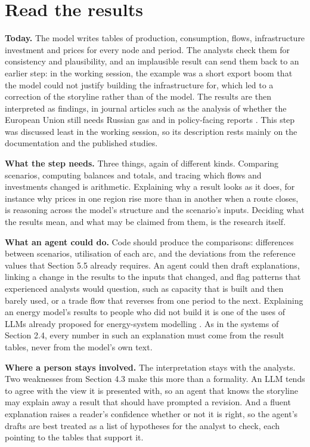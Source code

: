 \section{Read the results}

\textbf{Today.} The model writes tables of production, consumption, flows, infrastructure investment and prices for every node and period.
The analysts check them for consistency and plausibility, and an implausible result can send them back to an earlier step: in the working session, the example was a short export boom that the model could not justify building the infrastructure for, which led to a correction of the storyline rather than of the model.
The results are then interpreted as findings, in journal articles such as the analysis of whether the European Union still needs Russian gas \citep{barner2025russian} and in policy-facing reports \citep{holz2024diw}.
This step was discussed least in the working session, so its description rests mainly on the documentation and the published studies.

\textbf{What the step needs.} Three things, again of different kinds.
Comparing scenarios, computing balances and totals, and tracing which flows and investments changed is arithmetic.
Explaining why a result looks as it does, for instance why prices in one region rise more than in another when a route closes, is reasoning across the model's structure and the scenario's inputs.
Deciding what the results mean, and what may be claimed from them, is the research itself.

\textbf{What an agent could do.} Code should produce the comparisons: differences between scenarios, utilisation of each arc, and the deviations from the reference values that Section 5.5 already requires.
An agent could then draft explanations, linking a change in the results to the inputs that changed, and flag patterns that experienced analysts would question, such as capacity that is built and then barely used, or a trade flow that reverses from one period to the next.
Explaining an energy model's results to people who did not build it is one of the uses of LLMs already proposed for energy-system modelling \citep{forootani2025re}.
As in the systems of Section 2.4, every number in such an explanation must come from the result tables, never from the model's own text.

\textbf{Where a person stays involved.} The interpretation stays with the analysts.
Two weaknesses from Section 4.3 make this more than a formality.
An LLM tends to agree with the view it is presented with, so an agent that knows the storyline may explain away a result that should have prompted a revision.
And a fluent explanation raises a reader's confidence whether or not it is right, so the agent's drafts are best treated as a list of hypotheses for the analyst to check, each pointing to the tables that support it.
